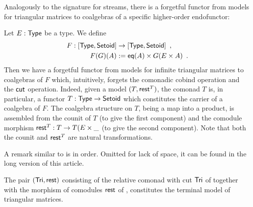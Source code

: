 \documentclass[a4paper,USenglish]{lipics}
\begin{document}
Analogously to the signature for streams, there is a forgetful functor from models for triangular matrices to coalgebras of a specific higher-order
endofunctor:

\begin{rem}
\begin{Long}
  Let $E : \mathsf{Type}$ be a type. We define 
  \begin{align*}  F: [\mathsf{Type},\mathsf{Setoid}] &\to [\mathsf{Type},\mathsf{Setoid}]  \enspace ,\\
                      F(G)(A) &:= \mathsf{eq}(A) \times G(E \times A) \enspace .
  \end{align*}
  Then we have a forgetful functor from models for infinite triangular matrices to coalgebras of $F$ which, intuitively, forgets the comonadic cobind operation and the $\mathsf{cut}$ operation.
  Indeed, given a model $(T,\mathsf{rest}^T)$, the comonad $T$ is, in particular, a functor $T:\mathsf{Type}\to\mathsf{Setoid}$ which constitutes the carrier of 
  a coalgebra of $F$. The coalgebra structure on $T$, being a map into a product, 
  is assembled from the counit of $T$ (to give the first component) 
  and the comodule morphism $\mathsf{rest}^T : T \to T(E\times \_$ (to give the second component).
  Note that both the counit and $\mathsf{rest}^T$ are natural transformations.
\end{Long}
\begin{Short}
 A remark similar to  is in order. Omitted for lack of space, it can be found in the long
 version of this article.
\end{Short}
\end{rem}


   

\begin{thm}\label{ex:final_sem_tri} 
   The pair $(\mathsf{Tri}, \mathsf{rest})$ consisting of the relative comonad with cut $\mathsf{Tri}$ of  together with 
    the morphism of comodules $\mathsf{rest}$ of ,
   constitutes the terminal model of triangular matrices.
\end{thm}
\end{document}

